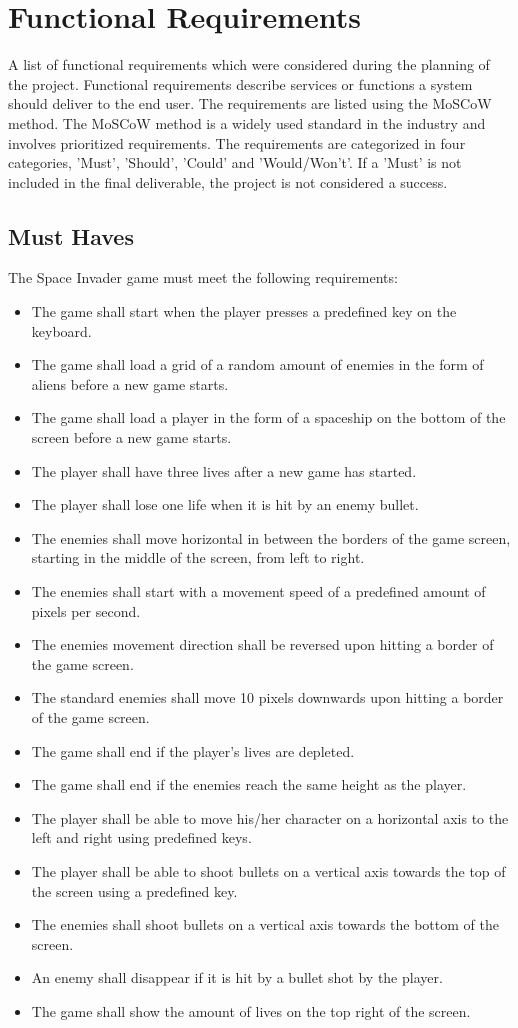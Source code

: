 \section{Functional Requirements}

A list of functional requirements which were considered during the planning of the project. Functional requirements describe services or functions a system should deliver to the end user. The requirements are listed using the MoSCoW method. The MoSCoW method is a widely used standard in the industry and involves prioritized requirements. The requirements are categorized in four categories, 'Must', 'Should', 'Could' and 'Would/Won't'. If a 'Must' is not included in the final deliverable, the project is not considered a success.

\subsection{Must Haves}
The Space Invader game must meet the following requirements:
\begin{itemize}
	\item The game shall start when the player presses a predefined  key on the keyboard.
	\item The game shall load a grid of a random amount of enemies in the form of aliens before a new game starts.
	\item The game shall load a player in the form of a spaceship on the bottom of the screen before a new game starts.
	\item The player shall have three lives after a new game has started.
	\item The player shall lose one life when it is hit by an enemy bullet.
	\item The enemies shall move horizontal in between the borders of the game screen, starting in the middle of the screen, from left to right.
	\item The enemies shall start with a movement speed of a predefined amount of pixels per second.
	\item The enemies movement direction shall be reversed upon hitting a border of the game screen.
	\item The standard enemies shall move 10 pixels downwards upon hitting a border of the game screen.
	\item The game shall end if the player's lives are depleted.
	\item The game shall end if the enemies reach the same height as the player.
	\item The player shall be able to move his/her character on a horizontal axis to the left and right using predefined keys.
	\item The player shall be able to shoot bullets on a vertical axis towards the top of the screen using a predefined key.
	\item The enemies shall shoot bullets on a vertical axis towards the bottom of the screen.
	\item An enemy shall disappear if it is hit by a bullet shot by the player.
	\item The game shall show the amount of lives on the top right of the screen.
\end{itemize}


